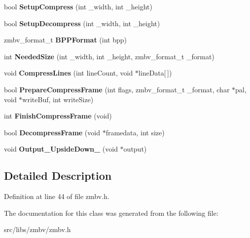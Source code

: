 \begin{DoxyCompactItemize}
\item 
\hypertarget{classVideoCodec_aea87b8fb5fb035c778638d88216831f9}{bool {\bfseries Setup\-Compress} (int \-\_\-width, int \-\_\-height)}\label{classVideoCodec_aea87b8fb5fb035c778638d88216831f9}

\item 
\hypertarget{classVideoCodec_abf15ef56d08da5ae564aff193e0b2c65}{bool {\bfseries Setup\-Decompress} (int \-\_\-width, int \-\_\-height)}\label{classVideoCodec_abf15ef56d08da5ae564aff193e0b2c65}

\item 
\hypertarget{classVideoCodec_aab1d0e5cf95793ebc9c8af205c07e63c}{zmbv\-\_\-format\-\_\-t {\bfseries B\-P\-P\-Format} (int bpp)}\label{classVideoCodec_aab1d0e5cf95793ebc9c8af205c07e63c}

\item 
\hypertarget{classVideoCodec_a893b6f9eb36852d594fad4e1cb2bc811}{int {\bfseries Needed\-Size} (int \-\_\-width, int \-\_\-height, zmbv\-\_\-format\-\_\-t \-\_\-format)}\label{classVideoCodec_a893b6f9eb36852d594fad4e1cb2bc811}

\item 
\hypertarget{classVideoCodec_ae3dedde4914fab6db8fede1e8178db0d}{void {\bfseries Compress\-Lines} (int line\-Count, void $\ast$line\-Data\mbox{[}$\,$\mbox{]})}\label{classVideoCodec_ae3dedde4914fab6db8fede1e8178db0d}

\item 
\hypertarget{classVideoCodec_a5336800755372baf360017edf4d68548}{bool {\bfseries Prepare\-Compress\-Frame} (int flags, zmbv\-\_\-format\-\_\-t \-\_\-format, char $\ast$pal, void $\ast$write\-Buf, int write\-Size)}\label{classVideoCodec_a5336800755372baf360017edf4d68548}

\item 
\hypertarget{classVideoCodec_a7c82b7a80b527a623468da05f07b6873}{int {\bfseries Finish\-Compress\-Frame} (void)}\label{classVideoCodec_a7c82b7a80b527a623468da05f07b6873}

\item 
\hypertarget{classVideoCodec_a38561ab71d5dff2189073e3747319733}{bool {\bfseries Decompress\-Frame} (void $\ast$framedata, int size)}\label{classVideoCodec_a38561ab71d5dff2189073e3747319733}

\item 
\hypertarget{classVideoCodec_a3f29d31386be5442834b08de67454669}{void {\bfseries Output\-\_\-\-Upside\-Down\-\_} (void $\ast$output)}\label{classVideoCodec_a3f29d31386be5442834b08de67454669}

\end{DoxyCompactItemize}


\subsection{Detailed Description}


Definition at line 44 of file zmbv.\-h.



The documentation for this class was generated from the following file\-:\begin{DoxyCompactItemize}
\item 
src/libs/zmbv/zmbv.\-h\end{DoxyCompactItemize}
